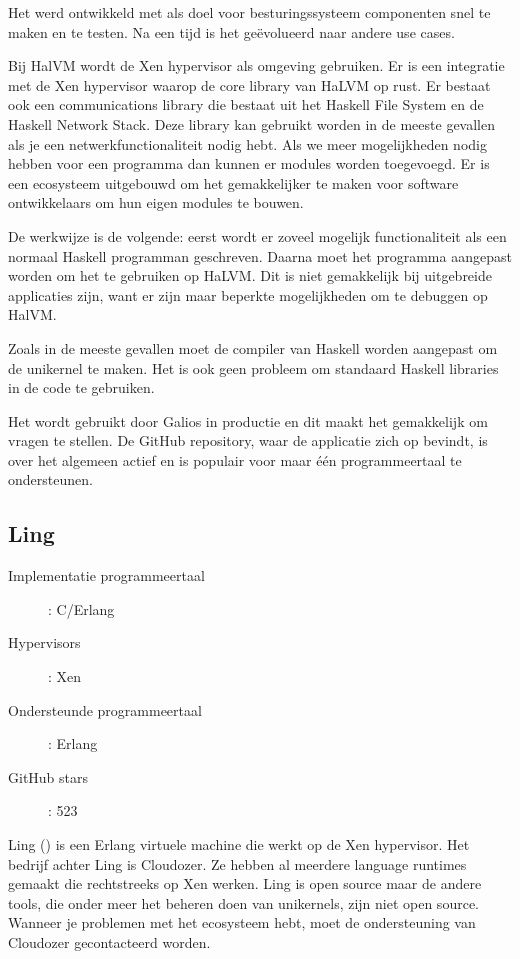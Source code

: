 \documentclass[pdftex,a4paper,12pt,twoside]{report}
\begin{document}
Het werd ontwikkeld met als doel voor besturingssysteem componenten snel te maken en te testen. Na een tijd is het geëvolueerd naar andere use cases.

Bij HalVM wordt de Xen hypervisor als omgeving gebruiken. Er is een integratie met de Xen hypervisor waarop de core library van HaLVM op rust. Er bestaat ook een communications library die bestaat uit het Haskell File System en de Haskell Network Stack. Deze library kan gebruikt worden in de meeste gevallen als je een netwerkfunctionaliteit nodig hebt. Als we meer mogelijkheden nodig hebben voor een programma dan kunnen er modules worden toegevoegd. Er is een ecosysteem uitgebouwd om het gemakkelijker te maken voor software ontwikkelaars om hun eigen modules te bouwen.

De werkwijze is de volgende: eerst wordt er zoveel mogelijk functionaliteit als een normaal Haskell programman geschreven. Daarna moet het programma aangepast worden om het te gebruiken op HaLVM.
Dit is niet gemakkelijk bij uitgebreide applicaties zijn, want er zijn maar beperkte mogelijkheden om te debuggen op HalVM.

Zoals in de meeste gevallen moet de compiler van Haskell worden aangepast om de unikernel te maken. Het is ook geen probleem om standaard Haskell libraries in de code te gebruiken.

Het wordt gebruikt door Galios in productie en dit maakt het gemakkelijk om vragen te stellen. De GitHub repository, waar de applicatie zich op bevindt, is over het algemeen actief en is populair voor maar één programmeertaal te ondersteunen.

\subsection{Ling}

\begin{description}
  \item [Implementatie programmeertaal]: C/Erlang
  \item [Hypervisors]: Xen
  \item [Ondersteunde programmeertaal]: Erlang
  \item [GitHub stars]: 523
\end{description}

Ling (\cite{erlang_on_xen_cloudozer/ling_????}) is een Erlang virtuele machine die werkt op de Xen hypervisor. Het bedrijf achter Ling is Cloudozer. Ze hebben al meerdere language runtimes gemaakt die rechtstreeks op Xen werken.
Ling is open source maar de andere tools, die onder meer het beheren doen van unikernels, zijn niet open source. Wanneer je problemen met het ecosysteem hebt, moet de ondersteuning van Cloudozer gecontacteerd worden.
\end{document}
